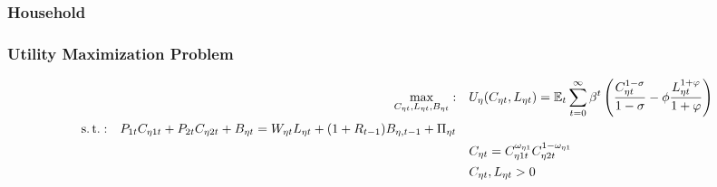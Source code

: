 \documentclass[../thesis.tex]{subfiles}
\begin{document}
\newpage




\subsubsection{Household}

\subsubsection*{Utility Maximization Problem}

\vspace*{-1cm}

\begin{align}
	\max_{C_{\eta t}, L_{\eta t}, B_{\eta t}}: \quad & U_{\eta}(C_{\eta t},L_{\eta t}) = {\mathbb{E}_{t}} \sum_{t=0}^{\infty} \beta^t \left(\frac{C_{\eta t}^{1-\sigma}}{1-\sigma} - \phi \frac{L_{\eta t}^{1+\varphi}}{1+\varphi} \right) \label{eq_v5:reg-utility-function-0} 
	\\
	\begin{split}
		\operatorname{s.t.}: \quad & P_{1 t} C_{\eta 1 t} + P_{2 t} C_{\eta 2 t} + B_{\eta t} = 
		W_{\eta t} L_{\eta t} + (1 + R_{t-1}) B_{\eta,t-1} + \Pi_{\eta t}
	\end{split} \label{eq_v5:reg-budget-constraint} \\
	\quad & C_{\eta t} = C_{\eta 1 t}^{\omega_{\eta 1}} C_{\eta 2 t}^{1-\omega_{\eta 1}} \label{eq_v5:reg-consumption-aggregation} \\
	\quad & C_{\eta t}, L_{\eta t} > 0 \nonumber
\end{align}
\end{document}

